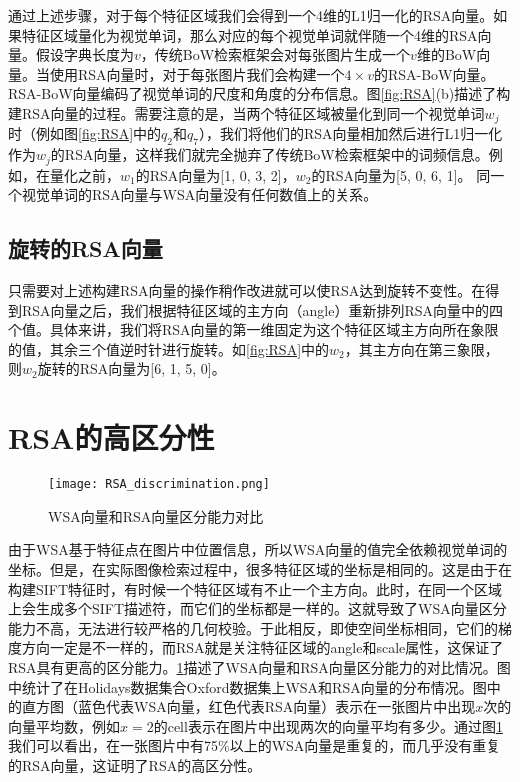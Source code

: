 通过上述步骤，对于每个特征区域我们会得到一个4维的L1归一化的RSA向量。如果特征区域量化为视觉单词，那么对应的每个视觉单词就伴随一个4维的RSA向量。假设字典长度为$v$，传统BoW检索框架会对每张图片生成一个$v$维的BoW向量。当使用RSA向量时，对于每张图片我们会构建一个$4 \times v$的RSA-BoW向量。RSA-BoW向量编码了视觉单词的尺度和角度的分布信息。图\ref{fig:RSA}(b)描述了构建RSA向量的过程。需要注意的是，当两个特征区域被量化到同一个视觉单词$w_j$时（例如图\ref{fig:RSA}中的$q_2$和$q_7$），我们将他们的RSA向量相加然后进行L1归一化作为$w_j$的RSA向量，这样我们就完全抛弃了传统BoW检索框架中的词频信息。例如，在量化之前，$w_1$的RSA向量为[1, 0, 3, 2]，$w_2$的RSA向量为[5, 0, 6, 1]。 同一个视觉单词的RSA向量与WSA向量\cite{penatti2014visual}没有任何数值上的关系。

\subsection{旋转的RSA向量}
只需要对上述构建RSA向量的操作稍作改进就可以使RSA达到旋转不变性。在得到RSA向量之后，我们根据特征区域的主方向（angle）重新排列RSA向量中的四个值。具体来讲，我们将RSA向量的第一维固定为这个特征区域主方向所在象限的值，其余三个值逆时针进行旋转。如\ref{fig:RSA}中的$w_2$，其主方向在第三象限，则$w_2$旋转的RSA向量为[6, 1, 5, 0]。

\section{RSA的高区分性}
\begin{figure}[h]
	\centering
	\texttt{[image: RSA\_discrimination.png]}
	\caption{WSA向量和RSA向量区分能力对比}\label{fig:RSA_disc}
\end{figure}
由于WSA\cite{penatti2014visual}基于特征点在图片中位置信息，所以WSA向量的值完全依赖视觉单词的坐标。但是，在实际图像检索过程中，很多特征区域的坐标是相同的。这是由于在构建SIFT\cite{lowe2004distinctive}特征时，有时候一个特征区域有不止一个主方向。此时，在同一个区域上会生成多个SIFT描述符，而它们的坐标都是一样的。这就导致了WSA向量区分能力不高，无法进行较严格的几何校验。于此相反，即使空间坐标相同，它们的梯度方向一定是不一样的，而RSA就是关注特征区域的angle和scale属性，这保证了RSA具有更高的区分能力。\ref{fig:RSA_disc}描述了WSA向量和RSA向量区分能力的对比情况。图中统计了在Holidays\cite{jegou2008hamming}数据集合Oxford\cite{philbin2007object}数据集上WSA和RSA向量的分布情况。图中的直方图（蓝色代表WSA向量，红色代表RSA向量）表示在一张图片中出现$x$次的向量平均数，例如$x=2$的cell表示在图片中出现两次的向量平均有多少。通过图\ref{fig:RSA_disc}我们可以看出，在一张图片中有75\%以上的WSA向量是重复的，而几乎没有重复的RSA向量，这证明了RSA的高区分性。

